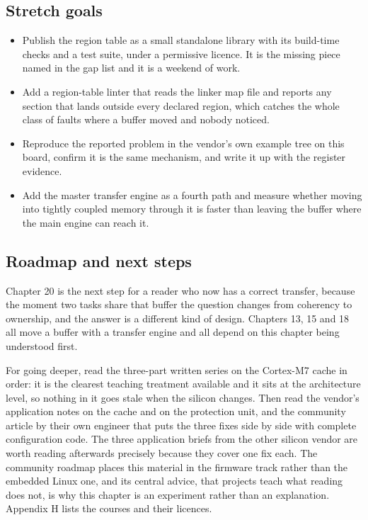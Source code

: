 \subsection*{Stretch goals}

\begin{itemize}
\item Publish the region table as a small standalone library with its
build-time checks and a test suite, under a permissive licence. It is the
missing piece named in the gap list and it is a weekend of work.
\item Add a region-table linter that reads the linker map file and reports any
section that lands outside every declared region, which catches the whole class
of faults where a buffer moved and nobody noticed.
\item Reproduce the reported problem in the vendor's own example tree on this
board, confirm it is the same mechanism, and write it up with the register
evidence.
\item Add the master transfer engine as a fourth path and measure whether
moving into tightly coupled memory through it is faster than leaving the
buffer where the main engine can reach it.
\end{itemize}

\subsection*{Roadmap and next steps}

Chapter 20 is the next step for a reader who now has a correct transfer,
because the moment two tasks share that buffer the question changes from
coherency to ownership, and the answer is a different kind of design.
Chapters 13, 15 and 18 all move a buffer with a transfer engine and all depend
on this chapter being understood first.

For going deeper, read the three-part written series on the Cortex-M7 cache in
order: it is the clearest teaching treatment available and it sits at the
architecture level, so nothing in it goes stale when the silicon changes. Then
read the vendor's application notes on the cache and on the protection unit,
and the community article by their own engineer that puts the three fixes side
by side with complete configuration code. The three application briefs from
the other silicon vendor are worth reading afterwards precisely because they
cover one fix each. The community roadmap places this material in the firmware
track rather than the embedded Linux one, and its central advice, that projects
teach what reading does not, is why this chapter is an experiment rather than
an explanation. Appendix H lists the courses and their licences.


